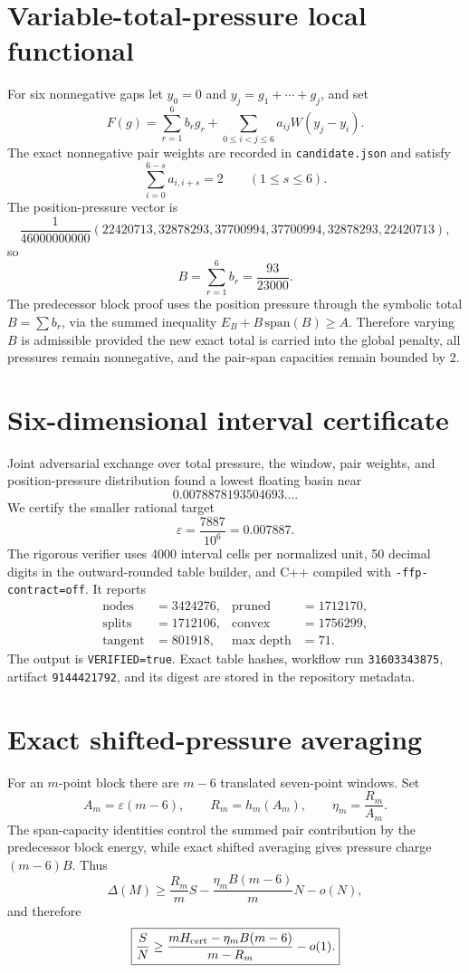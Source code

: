 \documentclass[11pt]{article}
\begin{document}
\section{Variable-total-pressure local functional}
For six nonnegative gaps let $y_0=0$ and $y_j=g_1+\cdots+g_j$, and set
\[
F(g)=\sum_{r=1}^{6}b_rg_r+
\sum_{0\le i<j\le6}a_{ij}W(y_j-y_i).
\]
The exact nonnegative pair weights are recorded in \texttt{candidate.json} and satisfy
\[
\sum_{i=0}^{6-s}a_{i,i+s}=2\qquad(1\le s\le6).
\]
The position-pressure vector is
\[
\frac1{46000000000}(22420713,32878293,37700994,37700994,32878293,22420713),
\]
so
\[
B=\sum_{r=1}^{6}b_r=\frac{93}{23000}.
\]
The predecessor block proof uses the position pressure through the symbolic total $B=\sum b_r$, via the summed inequality $E_B+B\,\mathrm{span}(B)\ge A$. Therefore varying $B$ is admissible provided the new exact total is carried into the global penalty, all pressures remain nonnegative, and the pair-span capacities remain bounded by 2.

\section{Six-dimensional interval certificate}
Joint adversarial exchange over total pressure, the window, pair weights, and position-pressure distribution found a lowest floating basin near
\[
0.0078878193504693\ldots.
\]
We certify the smaller rational target
\[
\varepsilon=\frac{7887}{10^6}=0.007887.
\]
The rigorous verifier uses 4000 interval cells per normalized unit, 50 decimal digits in the outward-rounded table builder, and C++ compiled with \texttt{-ffp-contract=off}. It reports
\[
\begin{aligned}
\text{nodes}&=3424276, & \text{pruned}&=1712170,\\
\text{splits}&=1712106, & \text{convex}&=1756299,\\
\text{tangent}&=801918, & \text{max depth}&=71.
\end{aligned}
\]
The output is \texttt{VERIFIED=true}. Exact table hashes, workflow run \texttt{31603343875}, artifact \texttt{9144421792}, and its digest are stored in the repository metadata.

\section{Exact shifted-pressure averaging}
For an $m$-point block there are $m-6$ translated seven-point windows. Set
\[
A_m=\varepsilon(m-6),\qquad
R_m=h_m(A_m),\qquad
\eta_m=\frac{R_m}{A_m}.
\]
The span-capacity identities control the summed pair contribution by the predecessor block energy, while exact shifted averaging gives pressure charge $(m-6)B$. Thus
\[
\Delta(M)\ge\frac{R_m}{m}S-\frac{\eta_mB(m-6)}{m}N-o(N),
\]
and therefore
\[
\boxed{\frac SN\ge\frac{mH_{\rm cert}-\eta_mB(m-6)}{m-R_m}-o(1).}
\]
\end{document}
